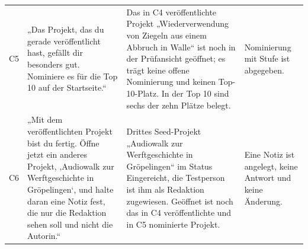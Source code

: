 \begin{longtable}{@{}L{0.6cm}L{6.1cm}L{3.8cm}L{4.2cm}@{}}
	C5 & „Das Projekt, das du gerade veröffentlicht hast, gefällt dir besonders gut. Nominiere es für die Top 10 auf der Startseite.“ & Das in C4 veröffentlichte Projekt „Wiederverwendung von Ziegeln aus einem Abbruch in Walle“ ist noch in der Prüfansicht geöffnet; es trägt keine offene Nominierung und keinen Top-10-Platz. In der Top 10 sind sechs der zehn Plätze belegt. & Nominierung mit Stufe ist abgegeben. \\
	C6 & „Mit dem veröffentlichten Projekt bist du fertig. Öffne jetzt ein anderes Projekt, ‚Audiowalk zur Werftgeschichte in Gröpelingen‘, und halte daran eine Notiz fest, die nur die Redaktion sehen soll und nicht die Autorin.“ & Drittes Seed-Projekt „Audiowalk zur Werftgeschichte in Gröpelingen“ im Status Eingereicht, die Testperson ist ihm als Redaktion zugewiesen. Geöffnet ist noch das in C4 veröffentlichte und in C5 nominierte Projekt. & Eine Notiz ist angelegt, keine Antwort und keine Änderung. \\
\end{longtable}
\endgroup

